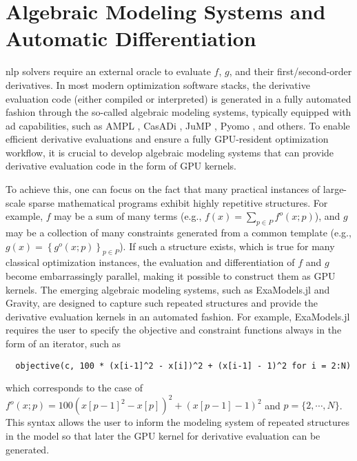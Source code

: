\documentclass{article}
\begin{document}
\section{Algebraic Modeling Systems and Automatic Differentiation}\label{eqn:ad}
\Gls*{nlp} solvers require an external oracle to evaluate $f$, $g$, and their first/second-order derivatives. In most modern optimization software stacks, the derivative evaluation code (either compiled or interpreted) is generated in a fully automated fashion through the so-called algebraic modeling systems, typically equipped with \gls*{ad} capabilities, such as AMPL \cite{fourerModelingLanguageMathematical1990}, CasADi \cite{anderssonCasADiSoftwareFramework2019}, JuMP \cite{dunningJuMPModelingLanguage2017}, Pyomo \cite{hartPyomoModelingSolving2011}, and others. To enable efficient derivative evaluations and ensure a fully GPU-resident optimization workflow, it is crucial to develop algebraic modeling systems that can provide derivative evaluation code in the form of GPU kernels.

To achieve this, one can focus on the fact that many practical instances of large-scale sparse mathematical programs exhibit highly repetitive structures. For example, $f$ may be a sum of many terms (e.g., $f(x) = \sum_{p\in P} f^o(x; p)$), and $g$ may be a collection of many constraints generated from a common template (e.g., $g(x) = \left\{g^o(x; p)\right\}_{p\in P}$). If such a structure exists, which is true for many classical optimization instances, the evaluation and differentiation of $f$ and $g$ become embarrassingly parallel, making it possible to construct them as GPU kernels. The emerging algebraic modeling systems, such as ExaModels.jl and Gravity, are designed to capture such repeated structures and provide the derivative evaluation kernels in an automated fashion. For example, ExaModels.jl requires the user to specify the objective and constraint functions always in the form of an iterator, such as
\begin{lstlisting}
  objective(c, 100 * (x[i-1]^2 - x[i])^2 + (x[i-1] - 1)^2 for i = 2:N)
\end{lstlisting}
which corresponds to the case of $f^o(x; p) = 100(x[p-1]^2 - x[p])^2 + (x[p-1]-1)^2$ and $p=\{2,\cdots,N\}$. This syntax allows the user to inform the modeling system of repeated structures in the model so that later the GPU kernel for derivative evaluation can be generated.
\end{document}

